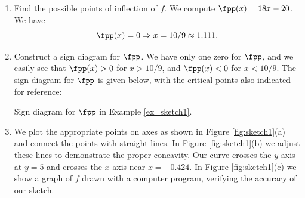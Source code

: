 {\begin{enumerate}
From the sign diagram, we see that $f$ is increasing on $(-\infty,c_1)\cup (c_2,\infty)$ (where $\fp(x)>0$, and $f$ is decreasing on $(c_1,c_2)$ (where $\fp(x)<0$).

Since $\fp$ changes from positive to negative at $c_1$, we know that $(c_1,f(c_1))$ is a local maximum, and since $\fp$ changes from negative to positive at $c_2$, we know that $(c_2,f(c_2))$ is a local minimum.

\item		Find the possible points of inflection of $f$. We compute $\fpp(x) = 18x-20$. We have 
\[
\fpp(x) = 0 \Rightarrow x= 10/9 \approx 1.111.
\]
\item		Construct a sign diagram for $\fpp$.
We have only one zero for $\fpp$, and we easily see that $\fpp(x)>0$ for $x>10/9$, and $\fpp(x)<0$ for $x<10/9$. The sign diagram for $\fpp$ is given below, with the critical points also indicated for reference:

\noindent\begin{minipage}{\textwidth}
\begin{center}
\end{center}
\captionsetup{type=figure}%
			\caption{Sign diagram for $\fpp$ in Example \ref{ex_sketch1}.}\label{fig:sketchline1fpp}
\end{minipage}


\item		We plot the appropriate points on axes as shown in Figure \ref{fig:sketch1}(a) and connect the points with straight lines. In Figure \ref{fig:sketch1}(b) we adjust these lines to demonstrate the proper concavity. Our curve crosses the $y$ axis at $y=5$ and crosses the $x$ axis near $x=-0.424$. In Figure \ref{fig:sketch1}(c) we show a graph of $f$ drawn with a computer program, verifying the accuracy of our sketch.
\end{enumerate}

}
